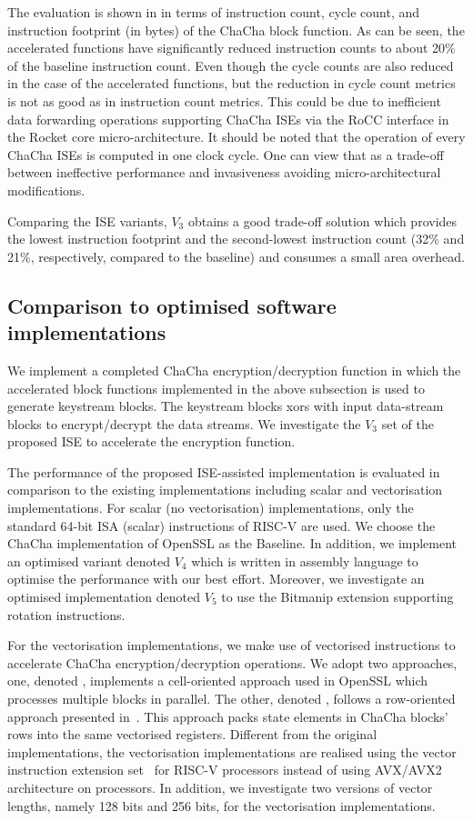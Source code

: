 The evaluation is shown in  in terms of instruction count, cycle count, and instruction footprint (in bytes) of the ChaCha block function. As can be seen, the accelerated functions have significantly reduced instruction counts to about 20\% of the baseline instruction count. Even though the cycle counts are also reduced in the case of the accelerated functions, but the reduction in cycle count metrics is not as good as in instruction count metrics. This could be due to inefficient data forwarding operations supporting ChaCha ISEs via the RoCC interface in the Rocket core micro-architecture. It should be noted that the operation of every ChaCha ISEs is computed in one clock cycle. One can view that as a trade-off between ineffective performance and invasiveness avoiding micro-architectural modifications.

Comparing the ISE variants, $V_3$ obtains a good trade-off solution which provides the lowest instruction footprint and the second-lowest instruction count (32\% and 21\%, respectively, compared to the baseline) and consumes a small area overhead.

\subsection{Comparison to optimised software implementations}
We implement a completed ChaCha encryption/decryption function in which the accelerated block functions implemented in the above subsection is used to generate keystream blocks. The keystream blocks xors with input data-stream blocks to encrypt/decrypt the data streams. We investigate the $V_3$ set of the proposed ISE to accelerate the encryption function. 

The performance of the proposed ISE-assisted implementation is evaluated in comparison to the existing implementations including scalar and vectorisation implementations.  
For scalar (no vectorisation) implementations, only the standard 64-bit ISA (scalar) instructions of RISC-V are used. We choose the ChaCha implementation of OpenSSL as the Baseline. In addition, we implement an optimised variant denoted $V_4$ which is written in assembly language to optimise the performance with our best effort. Moreover, we investigate an optimised implementation denoted $V_5$ to use the Bitmanip extension supporting rotation instructions.

For the vectorisation implementations, we make use of vectorised instructions to accelerate ChaCha encryption/decryption operations. 
We adopt two approaches, one, denoted , implements a cell-oriented approach used in OpenSSL which processes multiple blocks in parallel.
The other, denoted , follows a row-oriented approach presented in~\cite{GolGue:14}. This approach packs state elements in ChaCha blocks' rows into the same vectorised registers.
Different from the original implementations, the vectorisation implementations are realised using the vector instruction extension set~\cite{riscv:ext:vector:draft} for RISC-V processors instead of using AVX/AVX2 architecture on  processors.
In addition, we investigate two versions of vector lengths, namely 128 bits and 256 bits, for the vectorisation implementations. 

